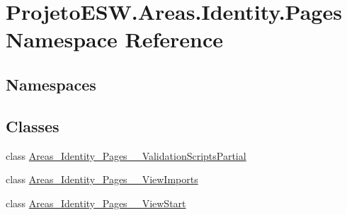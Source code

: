 \hypertarget{namespace_projeto_e_s_w_1_1_areas_1_1_identity_1_1_pages}{}\section{Projeto\+E\+S\+W.\+Areas.\+Identity.\+Pages Namespace Reference}
\label{namespace_projeto_e_s_w_1_1_areas_1_1_identity_1_1_pages}
\subsection*{Namespaces}
\begin{DoxyCompactItemize}
\end{DoxyCompactItemize}
\subsection*{Classes}
\begin{DoxyCompactItemize}
\item 
class \mbox{\hyperlink{class_projeto_e_s_w_1_1_areas_1_1_identity_1_1_pages_1_1_areas___identity___pages_____validation_scripts_partial}{Areas\+\_\+\+Identity\+\_\+\+Pages\+\_\+\+\_\+\+Validation\+Scripts\+Partial}}
\item 
class \mbox{\hyperlink{class_projeto_e_s_w_1_1_areas_1_1_identity_1_1_pages_1_1_areas___identity___pages_____view_imports}{Areas\+\_\+\+Identity\+\_\+\+Pages\+\_\+\+\_\+\+View\+Imports}}
\item 
class \mbox{\hyperlink{class_projeto_e_s_w_1_1_areas_1_1_identity_1_1_pages_1_1_areas___identity___pages_____view_start}{Areas\+\_\+\+Identity\+\_\+\+Pages\+\_\+\+\_\+\+View\+Start}}
\end{DoxyCompactItemize}
